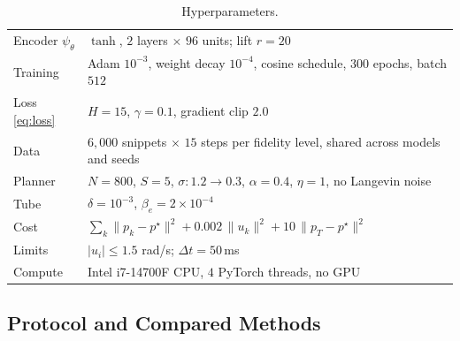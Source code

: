 \documentclass[letterpaper,10pt,conference]{ieeeconf}
\begin{document}
\begin{table}[t]
\centering
\begin{threeparttable}
\caption{Hyperparameters.}
\label{tab:hyper}
\footnotesize
\begin{tabularx}{\linewidth}{l L}
\toprule
Encoder $\psi_\theta$ & $\tanh$, $2$ layers $\times$ $96$ units; lift $r = 20$ \\
Training & Adam $10^{-3}$, weight decay $10^{-4}$, cosine schedule, $300$ epochs, batch $512$ \\
Loss \eqref{eq:loss} & $H = 15$, $\gamma = 0.1$, gradient clip $2.0$ \\
Data & $6{,}000$ snippets $\times$ $15$ steps per fidelity level, shared across models and seeds \\
Planner & $N = 800$, $S = 5$, $\sigma\!: 1.2 \to 0.3$, $\alpha = 0.4$, $\eta = 1$, no Langevin noise \\
Tube & $\delta = 10^{-3}$, $\beta_e = 2 \times 10^{-4}$ \\
Cost & $\sum_k \|p_k - p^\star\|^2 + 0.002\, \|u_k\|^2 + 10\, \|p_T - p^\star\|^2$ \\
Limits & $|u_i| \le 1.5$ rad/s; $\Delta t = 50$\,ms \\
Compute & Intel i7-14700F CPU, $4$ PyTorch threads, no GPU \\
\bottomrule
\end{tabularx}
\end{threeparttable}
\end{table}


\subsection{Protocol and Compared Methods}\label{subsec:setup}
\end{document}
